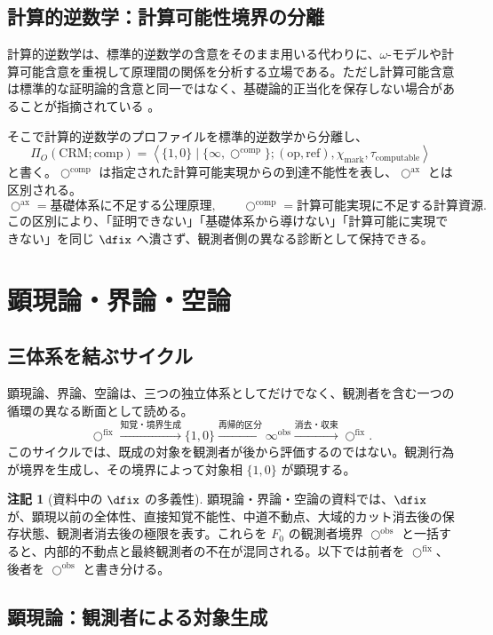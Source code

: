 \documentclass[a4paper,11pt]{ltjsarticle}
\theoremstyle{definition}
\newtheorem{remark}[definition]{注記}
\theoremstyle{plain}
\newcommand{\Phase}{\Pi}
\newcommand{\ofix}{\bigcirc^{\mathrm{fix}}}
\newcommand{\oobs}{\bigcirc^{\mathrm{obs}}}
\newcommand{\iobs}{\infty^{\mathrm{obs}}}
\newcommand{\oax}{\bigcirc^{\mathrm{ax}}}
\newcommand{\ocomp}{\bigcirc^{\mathrm{comp}}}
\begin{document}
\subsection{計算的逆数学：計算可能性境界の分離}

計算的逆数学は、標準的逆数学の含意をそのまま用いる代わりに、$\omega$-モデルや計算可能含意を重視して原理間の関係を分析する立場である。ただし計算可能含意は標準的な証明論的含意と同一ではなく、基礎論的正当化を保存しない場合があることが指摘されている \cite{Eastaugh2018}。

そこで計算的逆数学のプロファイルを標準的逆数学から分離し、
\[
 \Phase_O(\mathrm{CRM};\mathrm{comp})
 =
 \left\langle
 \{1,0\}\mid\{\infty,\ocomp\};
 (\mathrm{op},\mathrm{ref}),
 \chi_{\mathrm{mark}},
 \tau_{\mathrm{computable}}
 \right\rangle
\]
と書く。$\ocomp$ は指定された計算可能実現からの到達不能性を表し、$\oax$ とは区別される。
\[
 \oax
 =\text{基礎体系に不足する公理原理},
 \qquad
 \ocomp
 =\text{計算可能実現に不足する計算資源}.
\]
この区別により、「証明できない」「基礎体系から導けない」「計算可能に実現できない」を同じ $\dfix$ へ潰さず、観測者側の異なる診断として保持できる。

\section{顕現論・界論・空論}

\subsection{三体系を結ぶサイクル}

顕現論、界論、空論は、三つの独立体系としてだけでなく、観測者を含む一つの循環の異なる断面として読める。
\[
 \ofix
 \xrightarrow{\text{知覚・境界生成}}
 \{1,0\}
 \xrightarrow{\text{再帰的区分}}
 \iobs
 \xrightarrow{\text{消去・収束}}
 \ofix.
\]
このサイクルでは、既成の対象を観測者が後から評価するのではない。観測行為が境界を生成し、その境界によって対象相 $\{1,0\}$ が顕現する。

\begin{remark}[資料中の $\dfix$ の多義性]
顕現論・界論・空論の資料では、$\dfix$ が、顕現以前の全体性、直接知覚不能性、中道不動点、大域的カット消去後の保存状態、観測者消去後の極限を表す。これらを $F_0$ の観測者境界 $\oobs$ と一括すると、内部的不動点と最終観測者の不在が混同される。以下では前者を $\ofix$、後者を $\oobs$ と書き分ける。
\end{remark}

\subsection{顕現論：観測者による対象生成}
\end{document}

